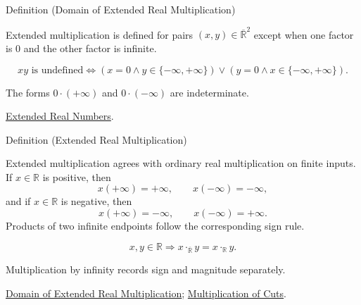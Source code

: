 \begin{definitionbox}{Definition (Domain of Extended Real Multiplication)}
\begin{definition}
\label{def:extended-real-multiplication-domain}
Extended multiplication is defined for pairs $(x,y)\in\overline{\mathbb{R}}^2$
except when one factor is $0$ and the other factor is infinite.
\end{definition}
\end{definitionbox}
\begin{remark*}
\[
xy\text{ is undefined}
\Longleftrightarrow
(x=0\land y\in\{-\infty,+\infty\})\lor
(y=0\land x\in\{-\infty,+\infty\}).
\]
\end{remark*}
\begin{remark*}[Interpretation]
The forms $0\cdot(+\infty)$ and $0\cdot(-\infty)$ are indeterminate.
\end{remark*}
\begin{dependencies}
\hyperref[def:extended-real-numbers]{Extended Real Numbers}.
\end{dependencies}

\begin{definitionbox}{Definition (Extended Real Multiplication)}
\begin{definition}
\label{def:extended-real-multiplication}
Extended multiplication agrees with ordinary real multiplication on finite
inputs. If $x\in\mathbb{R}$ is positive, then
\[
x(+\infty)=+\infty,\qquad x(-\infty)=-\infty,
\]
and if $x\in\mathbb{R}$ is negative, then
\[
x(+\infty)=-\infty,\qquad x(-\infty)=+\infty.
\]
Products of two infinite endpoints follow the corresponding sign rule.
\end{definition}
\end{definitionbox}
\begin{remark*}
\[
x,y\in\mathbb{R}\Rightarrow
x\cdot_{\overline{\mathbb{R}}}y=x\cdot_{\mathbb{R}}y.
\]
\end{remark*}
\begin{remark*}[Interpretation]
Multiplication by infinity records sign and magnitude separately.
\end{remark*}
\begin{dependencies}
\hyperref[def:extended-real-multiplication-domain]{Domain of Extended Real Multiplication};
\hyperref[def:multiplication-on-r]{Multiplication of Cuts}.
\end{dependencies}

